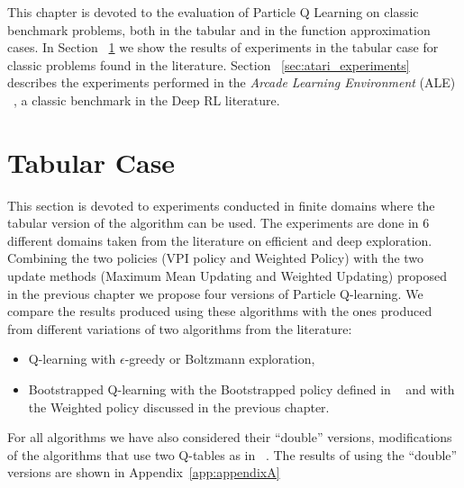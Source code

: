 This chapter is devoted to the evaluation of Particle Q Learning on classic benchmark problems, both in the tabular and in the function approximation cases. In Section ~\ref{sec:tabular_experiments} we show the results of experiments in the tabular case for classic problems found in the literature. Section ~\ref{sec:atari_experiments} describes the experiments performed in the \emph{Arcade Learning Environment} (ALE) ~\cite{Bellemare:2013:ALE:2566972.2566979}, a classic benchmark in the Deep RL literature. 
\section{Tabular Case} \label{sec:tabular_experiments}
This section is devoted to experiments conducted in finite domains where the tabular version of the algorithm can be used. The experiments are done in 6 different domains taken from the literature on efficient and deep exploration. Combining  the two policies (VPI policy and Weighted Policy) with the two update methods (Maximum Mean Updating and Weighted Updating) proposed in the previous chapter we propose four versions of Particle Q-learning. We compare the results produced using these algorithms with the ones produced from different variations of two algorithms from the literature:
\begin{itemize}
\item Q-learning with $\epsilon$-greedy or Boltzmann exploration,
\item Bootstrapped Q-learning with the Bootstrapped policy defined in ~\cite{DBLP:journals/corr/OsbandBPR16} and with the Weighted policy discussed in the previous chapter.
\end{itemize}
For all algorithms we have also considered their ``double'' versions, \ie modifications of the algorithms that use two Q-tables as in ~\cite{Hasselt:2016:DRL:3016100.3016191}. The results of using the ``double'' versions are shown in Appendix~\ref{app:appendixA} 

